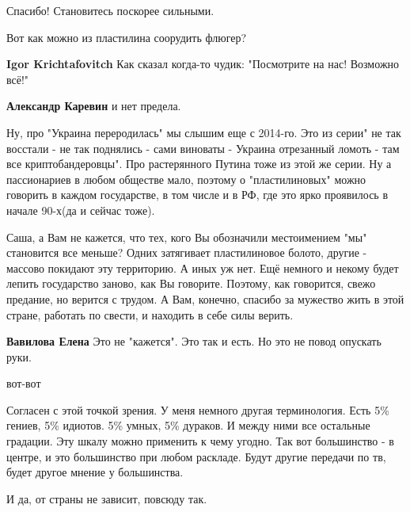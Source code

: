 \begin{itemize}
Спасибо! Становитесь поскорее сильными.

Вот как можно из пластилина соорудить флюгер?

\begin{itemize} %
\textbf{Igor Krichtafovitch} Как сказал когда-то чудик: "Посмотрите на нас! Возможно всё!"

\textbf{Александр Каревин} и нет предела.
\end{itemize} %


Ну, про "Украина переродилась" мы слышим еще с 2014-го. Это из серии" не так
восстали - не так поднялись - сами виноваты - Украина отрезанный ломоть - там все
криптобандеровцы". Про растерянного Путина тоже из этой же серии. Ну а
пассионариев в любом обществе мало, поэтому о "пластилиновых" можно говорить в
каждом государстве, в том числе и в РФ, где это ярко проявилось в начале 90-х(да
и сейчас тоже).


Саша, а Вам не кажется, что тех, кого Вы обозначили местоимением "мы"
становится все меньше? Одних затягивает пластилиновое болото, другие - массово
покидают эту территорию. А иных уж нет. Ещё немного и некому будет лепить
государство заново, как Вы говорите. Поэтому, как говорится, свежо предание, но
верится с трудом. А Вам, конечно, спасибо за мужество жить в этой стране,
работать по свести, и находить в себе силы верить.

\begin{itemize} %
\textbf{Вавилова Елена} Это не "кажется". Это так и есть. Но это не повод опускать руки.

вот-вот
\end{itemize} %


Согласен с этой точкой зрения. У меня немного другая терминология. Есть 5\%
гениев, 5\% идиотов. 5\% умных, 5\% дураков. И между ними все остальные градации.
Эту шкалу можно применить к чему угодно. Так вот большинство - в центре, и это
большинство при любом раскладе. Будут другие передачи по тв, будет другое
мнение у большинства.

И да, от страны не зависит, повсюду так.



\end{itemize}
